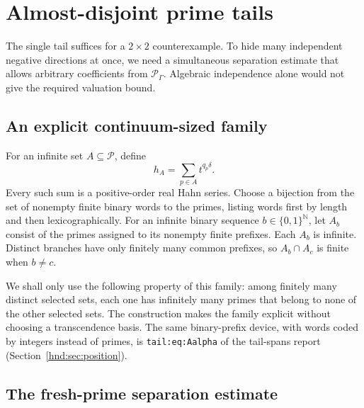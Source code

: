 \documentclass[11pt,oneside]{article}
\theoremstyle{definition}
\theoremstyle{remark}
\newcommand{\N}{\mathbb N}
\newcommand{\Pfield}{\mathscr P_\Gamma}
\newcommand{\primes}{\mathcal P}
\newcommand{\lbl}[1]{\nolinkurl{#1}}%
\begin{document}
\section{Almost-disjoint prime tails}\label{hnd:sec:tails}

The single tail suffices for a $2\times2$ counterexample. To hide many
independent negative directions at once, we need a simultaneous
separation estimate that allows arbitrary coefficients from $\Pfield$.
Algebraic independence alone would not give the required valuation bound.

\subsection{An explicit continuum-sized family}

For an infinite set $A\subseteq\primes$, define
\begin{equation}\label{hnd:eq:Atail}
 h_A=\sum_{p\in A}t^{q_p\delta}.
\end{equation}
Every such sum is a positive-order real Hahn series. Choose a bijection
from the set of nonempty finite binary words to the primes, listing words
first by length and then lexicographically. For an infinite binary
sequence $b\in\{0,1\}^{\N}$, let $A_b$ consist of the primes assigned to
its nonempty finite prefixes. Each $A_b$ is infinite. Distinct branches
have only finitely many common prefixes, so $A_b\cap A_c$ is finite
when $b\ne c$.

We shall only use the following property of this family: among finitely
many distinct selected sets, each one has infinitely many primes that
belong to none of the other selected sets. The construction makes the
family explicit without choosing a transcendence basis. The same
binary-prefix device, with words coded by integers instead of primes, is
\lbl{tail:eq:Aalpha} of the tail-spans report
(Section~\ref{hnd:sec:position}).

\subsection{The fresh-prime separation estimate}
\end{document}
